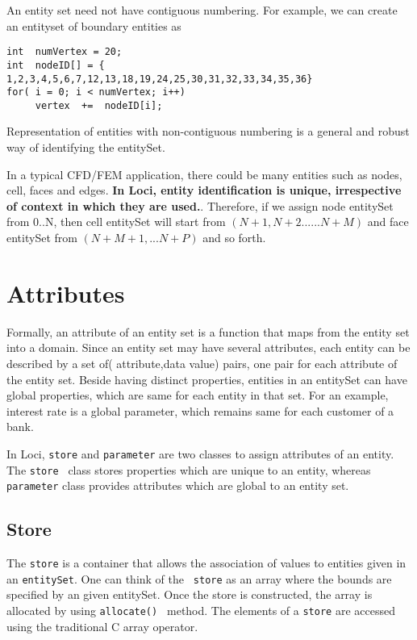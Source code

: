 An entity set need not have contiguous numbering. For example, we can create an entityset
of boundary entities as

\begin{verbatim}
int  numVertex = 20;
int  nodeID[] = { 1,2,3,4,5,6,7,12,13,18,19,24,25,30,31,32,33,34,35,36}
for( i = 0; i < numVertex; i++)
     vertex  +=  nodeID[i];
\end{verbatim}

Representation of entities with non-contiguous numbering is a general and robust 
way of identifying the entitySet.

\par In a typical CFD/FEM application, there could be many entities such as nodes, cell, 
faces and edges.  {\bf In Loci, entity identification is unique, irrespective
of context in which they are used.}. Therefore, if we assign node entitySet from 0..N,
then cell entitySet will start from $(N+1, N+2......N+M)$ and face entitySet from $(N+M+1,...N+P)$
and so forth.

\section { Attributes }

%
\par Formally, an attribute of an entity set is a function that maps from the entity
set into a domain. Since an entity set may have several attributes, each entity
can be described by a set of( attribute,data value) pairs, one pair for 
each attribute of the entity set. 
%
Beside having distinct properties, entities in an entitySet can have global
properties, which are same for each entity in that set. For an example, 
interest rate is a global parameter, which remains same for each customer
of a bank. 

\par In Loci, {\tt store} and {\tt parameter} are two classes to assign
attributes of an entity. The {\tt store } class stores properties which
are unique to an entity, whereas {\tt parameter} class provides attributes
which are global to an entity set.

\subsection{Store}
The {\tt store} is a container that allows the association of values
to entities given in an {\tt entitySet}.  One can think of the {\tt
store} as an array where the bounds are specified by an given
entitySet.  Once the store is constructed, the array is allocated by
using {\tt allocate() } method. The elements of a {\tt store} are 
accessed using the traditional C array operator. 

